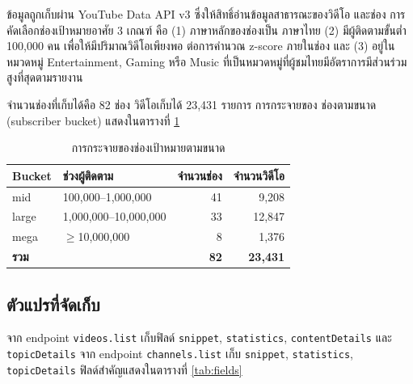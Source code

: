 ข้อมูลถูกเก็บผ่าน YouTube Data API v3 ซึ่งให้สิทธิ์อ่านข้อมูลสาธารณะของวิดีโอ
และช่อง การคัดเลือกช่องเป้าหมายอาศัย 3 เกณฑ์ คือ (1) ภาษาหลักของช่องเป็น
ภาษาไทย (2) มีผู้ติดตามขั้นต่ำ 100{,}000 คน เพื่อให้มีปริมาณวิดีโอเพียงพอ
ต่อการคำนวณ z-score ภายในช่อง และ (3) อยู่ในหมวดหมู่ Entertainment, Gaming
หรือ Music ที่เป็นหมวดหมู่ที่ผู้ชมไทยมีอัตราการมีส่วนร่วมสูงที่สุดตามรายงาน
\textcite{datareportal2025thailand}

จำนวนช่องที่เก็บได้คือ 82 ช่อง วิดีโอเก็บได้ 23{,}431 รายการ การกระจายของ
ช่องตามขนาด (subscriber bucket) แสดงในตารางที่ \ref{tab:channels}

\begin{table}[H]
\centering
\caption{การกระจายของช่องเป้าหมายตามขนาด}
\label{tab:channels}
\begin{tabularx}{\textwidth}{lXrr}
\toprule
\textbf{Bucket} & \textbf{ช่วงผู้ติดตาม} & \textbf{จำนวนช่อง} & \textbf{จำนวนวิดีโอ} \\
\midrule
mid     & 100{,}000--1{,}000{,}000  & 41 & 9{,}208 \\
large   & 1{,}000{,}000--10{,}000{,}000 & 33 & 12{,}847 \\
mega    & $\geq$10{,}000{,}000 & 8  & 1{,}376 \\
\midrule
\textbf{รวม} & & \textbf{82} & \textbf{23{,}431} \\
\bottomrule
\end{tabularx}
\end{table}

\subsection{ตัวแปรที่จัดเก็บ}

จาก endpoint \texttt{videos.list} เก็บฟิลด์ \texttt{snippet}, \texttt{statistics},
\texttt{contentDetails} และ \texttt{topicDetails} จาก endpoint
\texttt{channels.list} เก็บ \texttt{snippet}, \texttt{statistics},
\texttt{topicDetails} ฟิลด์สำคัญแสดงในตารางที่ \ref{tab:fields}

